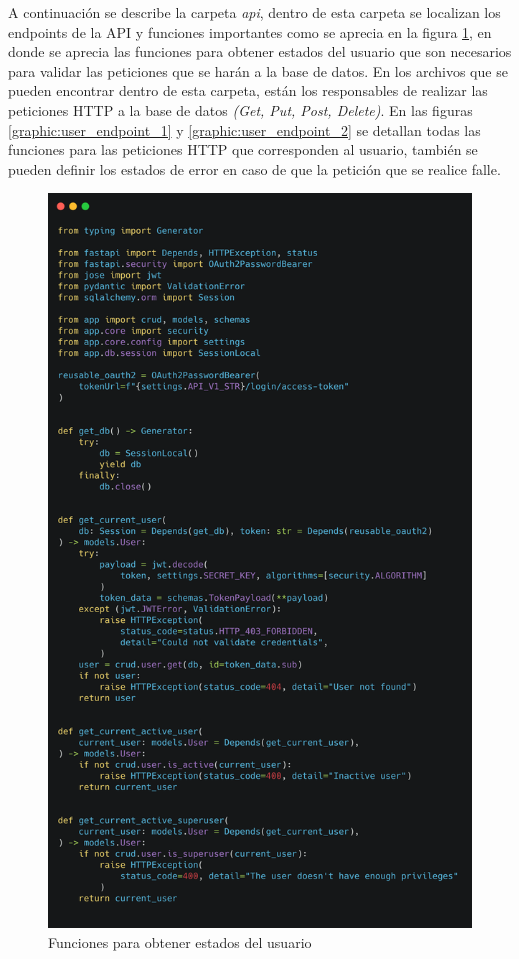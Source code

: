 A continuación se describe la carpeta \textit{api}, dentro de esta carpeta se localizan los endpoints de la API y funciones importantes como se aprecia en la figura \ref{graphic:deps}, en donde se aprecia las funciones para obtener estados del usuario que son necesarios para validar las peticiones que se harán a la base de datos. En los archivos que se pueden encontrar dentro de esta carpeta, están los responsables de realizar las peticiones HTTP a la base de datos \textit{(Get, Put, Post, Delete)}. En las figuras \ref{graphic:user_endpoint_1} y \ref{graphic:user_endpoint_2} se detallan todas las funciones para las peticiones HTTP que corresponden al usuario, también se pueden definir los estados de error en caso de que la petición que se realice falle.

\begin{figure}[!htb]
    \centering
    \includegraphics[scale=.10]{TT/img/implementacion/deps.png}
    \caption{Funciones para obtener estados del usuario}
    \label{graphic:deps}    
\end{figure}

